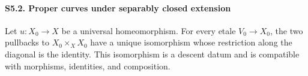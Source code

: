 \paragraph{S5.2. Proper curves under separably closed extension}

\begin{lemma}
\label{lemma:weil-pbc-universal-homeomorphism-descent-datum}
\uses{}
Let $u:X_0\to X$ be a universal homeomorphism.  For every etale
$V_0\to X_0$, the two pullbacks to $X_0\times_XX_0$ have a unique
isomorphism whose restriction along the diagonal is the identity.  This
isomorphism is a descent datum and is compatible with morphisms, identities,
and composition.
\end{lemma}
